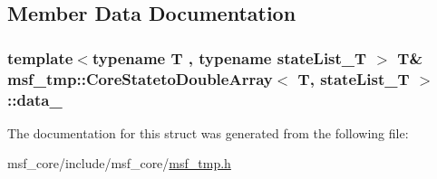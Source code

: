 \subsection{Member Data Documentation}
\hypertarget{structmsf__tmp_1_1CoreStatetoDoubleArray_abc6e8a0d369bb9840dcd25922f9196bb}{
\subsubsection[{data\-\_\-}]{\setlength{\rightskip}{0pt plus 5cm}template$<$typename T , typename state\-List\-\_\-\-T $>$ T\& {\bf msf\-\_\-tmp\-::\-Core\-Stateto\-Double\-Array}$<$ T, state\-List\-\_\-\-T $>$\-::data\-\_\-\hspace{0.3cm}{\ttfamily [private]}}}\label{structmsf__tmp_1_1CoreStatetoDoubleArray_abc6e8a0d369bb9840dcd25922f9196bb}


The documentation for this struct was generated from the following file\-:\begin{DoxyCompactItemize}
\item 
msf\-\_\-core/include/msf\-\_\-core/\hyperlink{msf__tmp_8h}{msf\-\_\-tmp.\-h}\end{DoxyCompactItemize}
